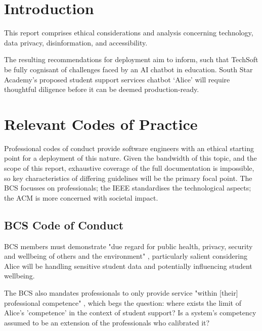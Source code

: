 \documentclass[14pt,a4paper]{article}
\begin{document}
\begin{multicols}{2}
\section{Introduction}
This report comprises ethical considerations and analysis concerning technology, data privacy, disinformation, and accessibility.

The resulting recommendations for deployment aim to inform, such that TechSoft be fully cognisant of challenges faced by an AI chatbot in education.
South Star Academy's proposed student support services chatbot `Alice' will require thoughtful diligence before it can be deemed production-ready.





\section{Relevant Codes of Practice}
Professional codes of conduct provide software engineers with an ethical starting point for a deployment of this nature.
Given the bandwidth of this topic, and the scope of this report, exhaustive coverage of the full documentation is impossible, so key characteristics of differing guidelines will be the primary focal point.
The BCS focusses on professionals; the IEEE standardises the technological aspects; the ACM is more concerned with societal impact.

\subsection{BCS Code of Conduct}
BCS members must demonstrate "due regard for public health, privacy, security and wellbeing of others and the environment" \textit{\parencite[p. 2]{BCS2024}}, particularly salient considering Alice will be handling sensitive student data and potentially influencing student wellbeing.

The BCS also mandates professionals to only provide service "within [their] professional competence" \textit{\parencite[p. 2]{BCS2024}}, which begs the question: where exists the limit of Alice's 'competence' in the context of student support?
Is a system's competency assumed to be an extension of the professionals who calibrated it?


\end{multicols}
\end{document}
